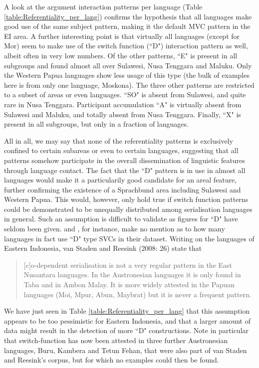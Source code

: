 A look at the argument interaction patterns per language (Table \ref{table:Referentiality_per_lang}) confirms the hypothesis that all languages make good use of the same subject pattern, making it the default MVC pattern in the EI area. A further interesting point is that virtually all languages (except for Mor) seem to make use of the switch function (``D") interaction pattern as well, albeit often in very low numbers. Of the other patterns, ``E" is present in all subgroups and found almost all over Sulawesi, Nusa Tenggara and Maluku. Only the Western Papua languages show less usage of this type (the bulk of examples here is from only one language, Moskona). The three other patterns are restricted to a subset of areas or even languages. ``SO" is absent from Sulawesi, and quite rare in Nusa Tenggara. Participant accumulation ``A" is virtually absent from Sulawesi and Maluku, and totally absent from Nusa Tenggara. Finally, ``X" is present in all subgroups, but only in a fraction of languages.

All in all, we may say that none of the referentiality patterns is exclusively confined to certain subareas or even to certain languages, suggesting that all patterns somehow participate in the overall dissemination of linguistic features through language contact. The fact that the ``D" pattern is in use in almost all languages would make it a particularily good candidate for an areal feature, further confirming the existence of a Sprachbund area including Sulawesi and Western Papua. This would, however, only hold true if switch function patterns could be demonstrated to be unequally distributed among serialisation languages in general. Such an assumption is difficult to validate as figures for ``D" have seldom been given. \textcite{Aikhenvald2006} and \textcite{Durie1997}, for instance, make no mention as to how many languages in fact use ``D" type SVCs in their dataset. Writing on the languages of Eastern Indonesia, van Staden and Reesink (2008: 26) state that \begin{quote}[c]o-dependent serialisation is not a very regular pattern in the East Nusantara languages. In the Austronesian languages it is only found in Taba and in Ambon Malay. It is more widely attested in the Papuan languages (Moi, Mpur, Abun, Maybrat) but it is never a frequent pattern.\end{quote}
We have just seen in Table \ref{table:Referentiality_per_lang} that this assumption appears to be too pessimistic for Eastern Indonesia, and that a larger amount of data might result in the detection of more ``D" constructions. Note in particular that switch-function has now been attested in three further Austronesian languages, Buru, Kambera and Tetun Fehan, that were also part of van Staden and Reesink's corpus, but for which no examples could then be found.

